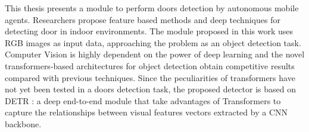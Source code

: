 This thesis presents a module to perform doors detection by autonomous mobile agents. Researchers propose feature based methods \cite{sonarandivisualdoordetection, humanoid, edgeandcornerdoorsdetector} and deep techniques \cite{detectdoorsfeature, doorsandnavigation, doorcabinet} for detecting door in indoor environments.  The module proposed in this work uses RGB images as input data, approaching the problem as an object detection task. Computer Vision is highly dependent on the power of deep learning and the novel transformers-based architectures for object detection obtain competitive results compared with previous techniques. Since the peculiarities of transformers have not yet been tested in a doors detection task, the proposed detector is based on DETR \cite{detr}: a deep end-to-end module that take advantages of Transformers to capture the relationships between visual features vectors extracted by a CNN backbone. 

